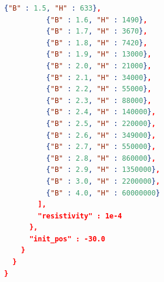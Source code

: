 \documentclass[justified]{tufte-book} %
\begin{document}
\begin{lstlisting}[language=json]
          {"B" : 1.5, "H" : 633},
          {"B" : 1.6, "H" : 1490},
          {"B" : 1.7, "H" : 3670},
          {"B" : 1.8, "H" : 7420},
          {"B" : 1.9, "H" : 13000},
          {"B" : 2.0, "H" : 21000},
          {"B" : 2.1, "H" : 34000},
          {"B" : 2.2, "H" : 55000},
          {"B" : 2.3, "H" : 88000},
          {"B" : 2.4, "H" : 140000},
          {"B" : 2.5, "H" : 220000},
          {"B" : 2.6, "H" : 349000},
          {"B" : 2.7, "H" : 550000},
          {"B" : 2.8, "H" : 860000},
          {"B" : 2.9, "H" : 1350000},
          {"B" : 3.0, "H" : 2200000},
          {"B" : 4.0, "H" : 60000000}
        ],
        "resistivity" : 1e-4
      },
      "init_pos" : -30.0
    }
  }
}
\end{lstlisting}



\backmatter




\printindex %
\end{document}

